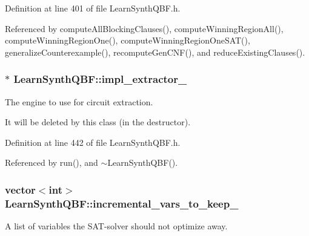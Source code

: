 Definition at line 401 of file Learn\-Synth\-Q\-B\-F.\-h.



Referenced by compute\-All\-Blocking\-Clauses(), compute\-Winning\-Region\-All(), compute\-Winning\-Region\-One(), compute\-Winning\-Region\-One\-S\-A\-T(), generalize\-Counterexample(), recompute\-Gen\-C\-N\-F(), and reduce\-Existing\-Clauses().

\hypertarget{classLearnSynthQBF_ad34b0c8db41c054eef617e7e9156fad8}{
\subsubsection[{impl\-\_\-extractor\-\_\-}]{$\ast$ Learn\-Synth\-Q\-B\-F\-::impl\-\_\-extractor\-\_\-\hspace{0.3cm}{\ttfamily [protected]}}}\label{classLearnSynthQBF_ad34b0c8db41c054eef617e7e9156fad8}


The engine to use for circuit extraction. 

It will be deleted by this class (in the destructor). 

Definition at line 442 of file Learn\-Synth\-Q\-B\-F.\-h.



Referenced by run(), and $\sim$\-Learn\-Synth\-Q\-B\-F().

\hypertarget{classLearnSynthQBF_a227ff215ffb411e57686aa3d8e7f7026}{
\subsubsection[{incremental\-\_\-vars\-\_\-to\-\_\-keep\-\_\-}]{\setlength{\rightskip}{0pt plus 5cm}vector$<$int$>$ Learn\-Synth\-Q\-B\-F\-::incremental\-\_\-vars\-\_\-to\-\_\-keep\-\_\-\hspace{0.3cm}{\ttfamily [protected]}}}\label{classLearnSynthQBF_a227ff215ffb411e57686aa3d8e7f7026}


A list of variables the S\-A\-T-\/solver should not optimize away. 



